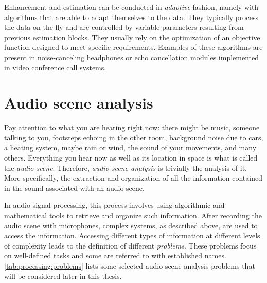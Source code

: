 \mynewline
Enhancement and estimation can be conducted in \textit{adaptive} fashion, namely with algorithms that are able to adapt themselves to the data.
They typically process the data on the fly and are controlled by variable parameters resulting from previous estimation blocks.
They usually rely on the optimization of an objective function designed to meet specific requirements.
Examples of these algorithms are present in noise-canceling headphones or echo cancellation modules implemented in video conference call systems.

\section{Audio scene analysis}\label{sec:intro:scene}
Pay attention to what you are hearing right now:
there might be music, someone talking to you, footsteps echoing in the other room, background noise due to cars, a heating system, maybe rain or wind, the sound of your movements, and many others.
Everything you hear now as well as its location in space is what is called the \textit{audio scene}.
Therefore, \textit{audio scene analysis} is trivially the analysis of it.
More specifically, the extraction and organization of all the information contained in the sound associated with an audio scene.

\mynewline
In audio signal processing, this process involves using algorithmic and mathematical tools to retrieve and organize such information.
After recording the audio scene with microphones, complex systems, as described above, are used to access the information.
Accessing different types of information at different levels of complexity leads to the definition of different \textit{problems}.
These problems focus on well-defined tasks and some are referred to with established names.
\cref{tab:processing:problems} lists some selected audio scene analysis problems that will be considered later in this thesis.


